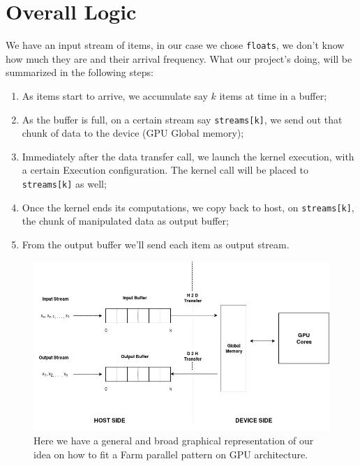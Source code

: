 \section{Overall Logic}
\label{sect:overallLogica}
We have an input stream of items, in our case we chose \texttt{floats}, we don't know how much they are and their arrival frequency.
What our project's doing, will be summarized in the following steps:
\begin{enumerate}
	\item As items start to arrive, we accumulate say \(k\) items at time in a buffer;
	\item As the buffer is full, on a certain stream say \texttt{streams[k]}, we send out that chunk of data to the device (GPU Global memory);
	\item Immediately after the data transfer call, we launch the kernel execution, with a certain Execution configuration. The kernel call will be placed to \texttt{streams[k]} as well;
	\item Once the kernel ends its computations, we copy back to host, on \texttt{streams[k]}, the chunk of manipulated data as output buffer;
	\item From the output buffer we'll send each item as output stream. 
\end{enumerate}

	\begin{figure}
		\includegraphics[width=\linewidth]{images/H2D.jpg}
		\caption{Here we have a general and broad graphical representation of our idea on how to fit a Farm parallel pattern on GPU architecture.}
		\label{fig:H2D}
	\end{figure}
	
